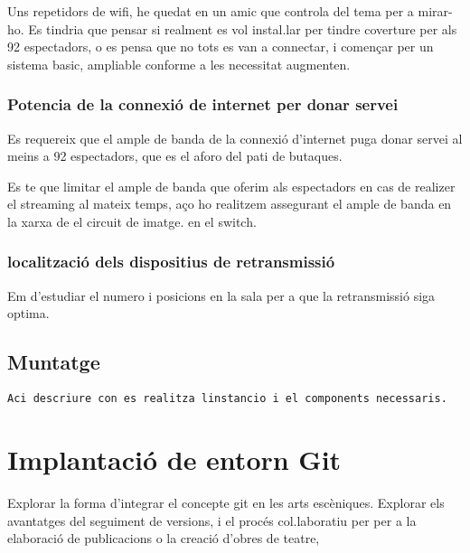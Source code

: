 \documentclass[
  10pt,
]{book}
\begin{document}
Uns repetidors de wifi, he quedat en un amic que controla del tema per a mirar-ho. Es tindria que pensar si realment es vol instal.lar per tindre coverture per als 92 espectadors, o es pensa que no tots es van a connectar, i començar per un sistema basic, ampliable conforme a les necessitat augmenten.

\hypertarget{potencia-de-la-connexiuxf3-de-internet-per-donar-servei}{%
\subsection{Potencia de la connexió de internet per donar servei}\label{potencia-de-la-connexiuxf3-de-internet-per-donar-servei}}

Es requereix que el ample de banda de la connexió d'internet puga donar servei al meins a 92 espectadors, que es el aforo del pati de butaques.

Es te que limitar el ample de banda que oferim als espectadors en cas de realizer el streaming al mateix temps, aço ho realitzem assegurant el ample de banda en la xarxa de el circuit de imatge. en el switch.

\hypertarget{localitzaciuxf3-dels-dispositius-de-retransmissiuxf3}{%
\subsection{localització dels dispositius de retransmissió}\label{localitzaciuxf3-dels-dispositius-de-retransmissiuxf3}}

Em d'estudiar el numero i posicions en la sala per a que la retransmissió siga optima.

\hypertarget{muntatge-1}{%
\section{Muntatge}\label{muntatge-1}}

\texttt{Aci\ descriure\ con\ es\ realitza\ l\textquotesingle{}instancio\ i\ el\ components\ necessaris.}

\hypertarget{implantaciuxf3-de-entorn-git}{%
\chapter{Implantació de entorn Git}\label{implantaciuxf3-de-entorn-git}}

Explorar la forma d'integrar el concepte git en les arts escèniques. Explorar els avantatges del seguiment de versions, i el procés col.laboratiu per per a la elaboració de publicacions o la creació d'obres de teatre,
\end{document}

